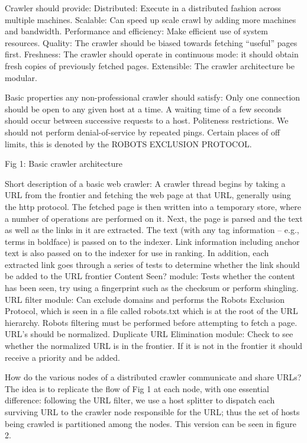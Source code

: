 Crawler should provide:
Distributed: Execute in a distributed fashion across multiple machines.
Scalable: Can speed up scale crawl by adding more machines and bandwidth.
Performance and efficiency: Make efficient use of system resources. 
Quality: The crawler should be biased towards fetching “useful” pages first.
Freshness: The crawler should operate in continuous mode: it should obtain fresh copies of previously fetched pages.
Extensible: The crawler architecture be modular.

Basic properties any non-professional crawler should satisfy:
 Only one connection should be open to any given host at a time.
 A waiting time of a few seconds should occur between successive requests to a host.
Politeness restrictions. We should not perform denial-of-service by repeated pings. Certain places of off limits, this is denoted by the ROBOTS EXCLUSION PROTOCOL.

Fig 1: Basic crawler architecture

Short description of a basic web crawler:
A crawler thread begins by taking a URL from the frontier and fetching the web page at that URL, generally using the http protocol. The fetched page is then written into a temporary store, where a number of operations are performed on it. Next, the page is parsed and the text as well as the links in it are extracted. The text (with any tag information – e.g., terms in boldface) is passed on to the indexer. Link information including anchor text is also passed on to the indexer for use in ranking. In addition, each extracted link goes through a series of tests to determine whether the link should be added to the URL frontier
Content Seen? module: Tests whether the content has been seen, try using a fingerprint such as the checksum or perform shingling.
URL filter module: Can exclude domains and performs the Robots Exclusion Protocol, which is seen in a file called robots.txt which is at the root of the URL hierarchy. Robots filtering must be performed before attempting to fetch a page. URL’s should be normalized. 
Duplicate URL Elimination module: Check to see whether the normalized URL is in the frontier. If it is not in the frontier it should receive a priority and be added.


How do the various nodes of a distributed crawler communicate and share URLs? The idea is to replicate the flow of Fig 1 at each node, with one essential difference: following the URL filter, we use a host splitter to dispatch each surviving URL to the crawler node responsible for the URL; thus the set of hosts being crawled is partitioned among the nodes. This version can be seen in figure 2.


